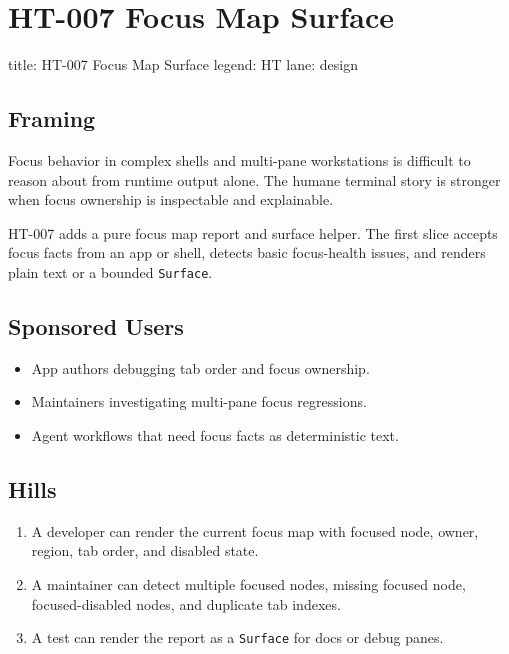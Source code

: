 \chapter{HT-007 Focus Map Surface}\label{record-257}

\smallskip

\begin{RecordMeta}
title: HT-007 Focus Map Surface
legend: HT
lane: design

\end{RecordMeta}

\section{Framing}\label{record-257-framing}

Focus behavior in complex shells and multi-pane workstations is difficult to reason about from runtime output alone. The humane terminal story is stronger when focus ownership is inspectable and explainable.

HT-007 adds a pure focus map report and surface helper. The first slice accepts focus facts from an app or shell, detects basic focus-health issues, and renders plain text or a bounded \texttt{S\allowbreak{}u\allowbreak{}r\allowbreak{}f\allowbreak{}a\allowbreak{}c\allowbreak{}e}.

\section{Sponsored Users}\label{record-257-sponsored-users}

\begin{itemize}
\tightlist
\item
  App authors debugging tab order and focus ownership.
\item
  Maintainers investigating multi-pane focus regressions.
\item
  Agent workflows that need focus facts as deterministic text.
\end{itemize}

\section{Hills}\label{record-257-hills}

\begin{enumerate}
\def\labelenumi{\arabic{enumi}.}
\tightlist
\item
  A developer can render the current focus map with focused node, owner, region, tab order, and disabled state.
\item
  A maintainer can detect multiple focused nodes, missing focused node, focused-disabled nodes, and duplicate tab indexes.
\item
  A test can render the report as a \texttt{S\allowbreak{}u\allowbreak{}r\allowbreak{}f\allowbreak{}a\allowbreak{}c\allowbreak{}e} for docs or debug panes.
\end{enumerate}

